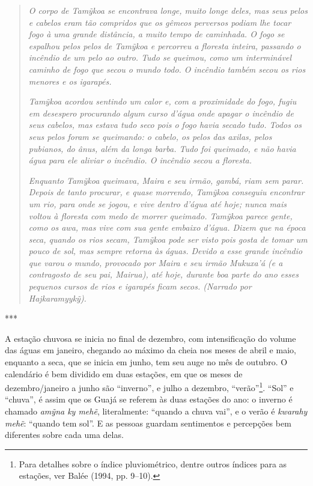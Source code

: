 \begin{quote}
\emph{O corpo de \emph{Tamỹkoa} se encontrava longe, muito longe deles, mas
seus pelos e cabelos eram tão compridos que os gêmeos perversos podiam
lhe tocar fogo à uma grande distância, a muito tempo de caminhada. O
fogo se espalhou pelos pelos de \emph{Tamỹkoa} e percorreu a floresta
inteira, passando o incêndio de um pelo ao outro. Tudo se queimou, como
um interminável caminho de fogo que secou o mundo todo. O incêndio
também secou os rios menores e os igarapés.}

\emph{\emph{Tamỹkoa} acordou sentindo um calor e, com a proximidade do fogo,
fugiu em desespero procurando algum curso d'água onde apagar o incêndio
de seus cabelos, mas estava tudo seco pois o fogo havia secado tudo.
Todos os seus pelos foram se queimando: o cabelo, os pelos das axilas,
pelos pubianos, do ânus, além da longa barba. Tudo foi queimado, e não
havia água para ele aliviar o incêndio. O incêndio secou a floresta.}

\emph{Enquanto \emph{Tamỹkoa} queimava, Maira e seu irmão, gambá, riam sem
parar. Depois de tanto procurar, e quase morrendo, \emph{Tamỹkoa}
conseguiu encontrar um rio, para onde se jogou, e vive dentro d'água até
hoje; nunca mais voltou à floresta com medo de morrer queimado.
\emph{Tamỹkoa} parece gente, como os \emph{awa}, mas vive com sua gente
embaixo d'água. Dizem que na época seca, quando os rios secam,
\emph{Tamỹkoa} pode ser visto pois gosta de tomar um pouco de sol, mas
sempre retorna às águas. Devido a esse grande incêndio que varou o
mundo, provocado por \emph{Maira} e seu irmão \emph{Mukuxa'á} (e a
contragosto de seu pai, \emph{Mairua}), até hoje, durante boa parte do
ano esses pequenos cursos de rios e igarapés ficam secos. (Narrado por
Hajkaramyykỹ).}
\end{quote}

\begin{center}
***
\end{center}

A estação chuvosa se inicia no final de dezembro, com intensificação do
volume das águas em janeiro, chegando ao máximo da cheia nos meses de
abril e maio, enquanto a seca, que se inicia em junho, tem seu auge no
mês de outubro. O calendário é bem dividido em duas estações, em que os
meses de dezembro/janeiro a junho são ``inverno'', e julho a dezembro,
``verão''\footnote{Para detalhes sobre o índice pluviométrico, dentre
  outros índices para as estações, ver Balée (1994, pp. 9--10).}. ``Sol''
e ``chuva'', é assim que os Guajá se referem às duas estações do ano: o
inverno é chamado \emph{amỹna ky mehẽ}, literalmente: ``quando a chuva
vai'', e o verão é \emph{kwarahy mehẽ}: ``quando tem sol''. E as pessoas
guardam sentimentos e percepções bem diferentes sobre cada uma delas.

